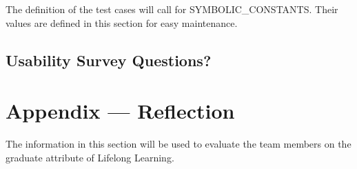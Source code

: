 \documentclass[12pt, titlepage]{article}
\begin{document}
The definition of the test cases will call for SYMBOLIC\_CONSTANTS.
Their values are defined in this section for easy maintenance.

\subsection{Usability Survey Questions?}


\newpage{}
\section*{Appendix --- Reflection}


The information in this section will be used to evaluate the team members on the
graduate attribute of Lifelong Learning.


\end{document}

